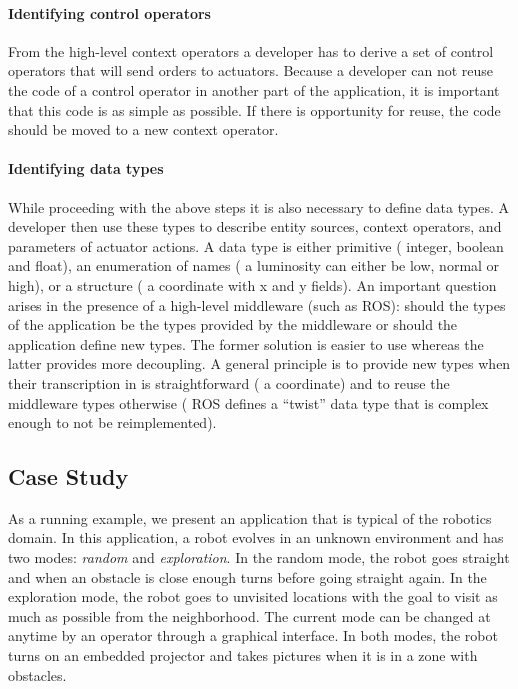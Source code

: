 \paragraph*{Identifying control operators}
From the high-level context operators a developer has to derive a set
of control operators that will send orders to actuators. Because a
developer can not reuse the code of a control operator in another part
of the application, it is important that this code is as simple as
possible. If there is opportunity for reuse, the code should be moved
to a new context operator.

\paragraph*{Identifying data types}
While proceeding with the above steps it is also necessary to define
data types. A developer then use these types to describe entity
sources, context operators, and parameters of actuator actions. A data
type is either primitive (\eg{} integer, boolean and float), an
enumeration of names (\eg{} a luminosity can either be low, normal or
high), or a structure (\eg{} a coordinate with x and y fields). An
important question arises in the presence of a high-level middleware
(such as ROS): should the types of the application be the types
provided by the middleware or should the application define new types.
The former solution is easier to use whereas the latter provides more
decoupling. A general principle is to provide new types when their
transcription in \diaspec{} is straightforward (\eg{} a coordinate)
and to reuse the middleware types otherwise (\eg{} ROS defines a
``twist'' data type that is complex enough to not be reimplemented).

\subsection{Case Study}

As a running example, we present an application that is typical of the
robotics domain. In this application, a robot evolves in an unknown
environment and has two modes: \emph{random} and \emph{exploration}.
In the random mode, the robot goes straight and when an obstacle is
close enough turns before going straight again. In the exploration
mode, the robot goes to unvisited locations with the goal to visit as
much as possible from the neighborhood. The current mode can be
changed at anytime by an operator through a graphical interface. In
both modes, the robot turns on an embedded projector and takes
pictures when it is in a zone with obstacles.

